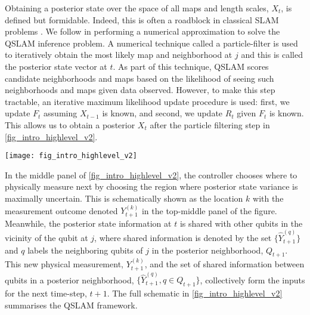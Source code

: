 Obtaining a posterior state over the space of all maps and length scales, $X_t$, is defined but formidable. Indeed, this is often a roadblock in classical SLAM problems \cite{thrun2005probabilistic,thrun2001probabilistic}. We follow \cite{thrun2001probabilistic} in performing a numerical approximation to solve the QSLAM inference problem. A numerical technique called a particle-filter is used to iteratively obtain the most likely map and neighborhood at $j$ and this is called the posterior state vector at $t$. As part of this technique, QSLAM scores candidate neighborhoods and maps based on the likelihood of seeing such neighborhoods and maps  given data observed. However, to make this step tractable, an iterative maximum likelihood update procedure is used: first, we update $F_t$ assuming $X_{t-1}$ is known, and second, we update $R_t$ given $F_t$ is known. This allows us to obtain a posterior $X_t$ after the particle filtering  step in \cref{fig_intro_highlevel_v2}.
\begin{figure*}
	\texttt{[image: fig\_intro\_highlevel\_v2]}
	\caption{\label{fig_intro_highlevel_v2} Schematic overview of QSLAM for an incoming qubit measurement, $Y^{(j)}_t$ at qubit $j$. A particle filter estimates the map, $F_t$, and discovers neighborhoods [circular shaded] parameterised by $R_t^{(j)}$ for sharing state information. Posterior state estimates from the particle filter are used (a) by the controller, to choose $k$ as the location of the next measurement, $Y^{(k)}_{t+1}$ based on regions of highest estimated uncertainty [middle top]; (b) to share information at $j$ within the posterior neighborhood, $Q$ via $\hat{Y}^{(q)}_{t+1}$, for  all $q \in Q$ [middle bottom] before commencing the next iteration.}  	
\end{figure*} 

In the middle panel of \cref{fig_intro_highlevel_v2}, the controller chooses where to physically measure next by choosing the region where posterior state variance is maximally uncertain. This is schematically shown as the location $k$ with the measurement outcome denoted $Y_{t+1}^{(k)}$ in the top-middle panel of the figure. Meanwhile, the posterior state information at $t$ is shared with other qubits in the vicinity of the qubit at $j$, where shared information is denoted by the set $\{\hat{Y}_{t+1}^{(q)} \}$ and $q$ labels the neighboring qubits of $j$ in the posterior neighborhood, $Q_{t+1}$. This new physical measurement, $Y_{t+1}^{(k)}$,  and the set of shared information between qubits in a posterior neighborhood, $\{\hat{Y}_{t+1}^{(q)}, q \in Q_{t+1}\}$,  collectively form the inputs for the next time-step, $t+1$. The full schematic in \cref{fig_intro_highlevel_v2} summarises the QSLAM framework.


